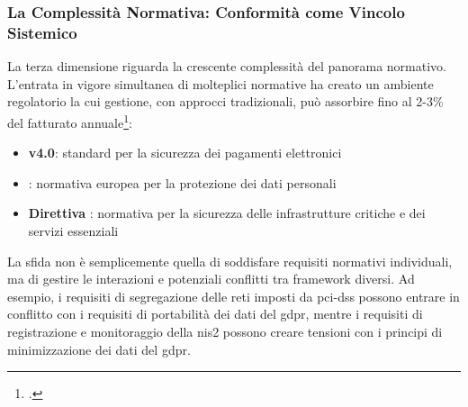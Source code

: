 \subsubsection{\texorpdfstring{La Complessità Normativa: Conformità come Vincolo Sistemico}{1.1.2.3 - La Complessità Normativa: Conformità come Vincolo Sistemico}}
\label{subsubsec:complessita_normativa}

La terza dimensione riguarda la crescente complessità del panorama normativo. L'entrata in vigore simultanea di molteplici normative ha creato un ambiente regolatorio la cui gestione, con approcci tradizionali, può assorbire fino al 2-3\% del fatturato annuale\footcite{ponemon2024compliance}:

\begin{itemize}
\item \textbf{ v4.0}: standard per la sicurezza dei pagamenti elettronici
\item \textbf{}: normativa europea per la protezione dei dati personali
\item \textbf{Direttiva }: normativa per la sicurezza delle infrastrutture critiche e dei servizi essenziali
\end{itemize}

La sfida non è semplicemente quella di soddisfare requisiti normativi individuali, ma di gestire le interazioni e potenziali conflitti tra framework diversi. Ad esempio, i requisiti di segregazione delle reti imposti da \gls{pci-dss} possono entrare in conflitto con i requisiti di portabilità dei dati del \gls{gdpr}, mentre i requisiti di registrazione e monitoraggio della \gls{nis2} possono creare tensioni con i principi di minimizzazione dei dati del \gls{gdpr}.

